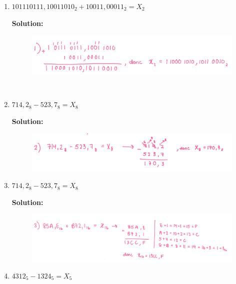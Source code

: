 \documentclass{article}
\begin{document}
\begin{enumerate}[label=\alph*), itemsep=2em]

  \item  $101110111,10011010_{2} + 10011,00011_{2} = X_{2}$
  
  \textbf{Solution:}
  \begin{figure}[h!]
    \centering
    \includegraphics[width=1\textwidth]{images/binary_addition_q3_1.png}
  \end{figure}
  \\

  \item $714,2_{8} - 523,7_{8} = X_{8}$
 
  \textbf{Solution:}
  \begin{figure}[h!]
    \centering
    \includegraphics[width=1\textwidth]{images/octonary_substraction_q3_2.png}
  \end{figure}

  \item $714,2_{8} - 523,7_{8} = X_{8}$
 
  \textbf{Solution:}
  \begin{figure}[h!]
    \centering
    \includegraphics[width=1\textwidth]{images/hexadecimal_addition_q3_3.png}
  \end{figure}

  \newpage

  \item $4312_{5} - 1324_{5} = X_{5}$
 

\end{enumerate}
\end{document}
